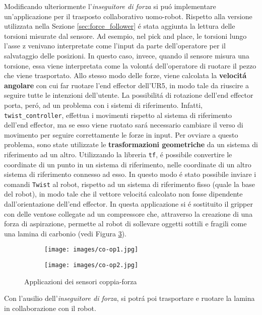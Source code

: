 Modificando ulteriormente l'\textit{inseguitore di forza} si pu\'{o} implementare un'applicazione 
per il trasposto collaborativo uomo-robot\footnotemark{}. Rispetto alla versione utilizzata nella Sezione \ref{sec:force_follower} \'{e} stata aggiunta 
la lettura delle torsioni misurate dal sensore. 
Ad esempio, nel pick and place, le torsioni lungo l'asse z venivano interpretate come l'input da parte dell'operatore per il salvataggio 
delle posizioni. In questo caso, invece, quando il sensore misura una torsione, essa viene interpretata come la volont\'{a} 
dell'operatore di ruotare il pezzo che viene trasportato.
Allo stesso modo delle forze, viene calcolata la \textbf{velocit\'{a} angolare} 
con cui far ruotare l'end effector dell'UR5, in modo tale da riuscire a seguire tutte le intenzioni dell'utente. 
La possibilit\'{a} di rotazione dell'end effector porta, per\'{o}, ad un problema con i sistemi di riferimento. 
Infatti, \verb|twist_controller|, effettua i movimenti rispetto al sistema di riferimento dell'end effector, ma se esso viene ruotato 
sar\'{a} necessario cambiare il verso di movimento per seguire correttamente le forze in input. Per ovviare a questo 
problema, sono state utilizzate le \textbf{trasformazioni geometriche} da un sistema di riferimento ad un altro. 
Utilizzando la libreria \verb|tf|, \'{e} possibile convertire le coordinate di un punto in un sistema di riferimento, nelle 
coordinate di un altro sistema di riferimento connesso ad esso. In questo modo \'{e} stato possibile inviare i comandi 
\verb|Twist| al robot, rispetto ad un sistema di riferimento fisso (quale la base del robot), in modo tale che il vettore velocit\'{a} 
calcolato non fosse dipendente dall'orientazione dell'end effector. 
In questa applicazione si \'{e} sostituito il gripper con delle ventose collegate ad un compressore che, attraverso la creazione di 
una forza di aspirazione, permette al robot di sollevare oggetti sottili e fragili come una lamina di carbonio (vedi Figura \ref{fig:co-op}).
\begin{figure}[H]
    \centering
    \begin{subfigure}[b]{0.45\textwidth}
        \texttt{[image: images/co-op1.jpg]}
        \label{fig:co-op1}
    \end{subfigure}
    \qquad
    \begin{subfigure}[b]{0.45\textwidth}
        \texttt{[image: images/co-op2.jpg]}
        \label{fig:co-op2}
    \end{subfigure}
    \caption{Applicazioni dei sensori coppia-forza}\label{fig:co-op}
\end{figure}
Con l'ausilio dell'\textit{inseguitore di forza}, si potr\'{a} poi trasportare e ruotare la lamina in collaborazione con il robot. 
